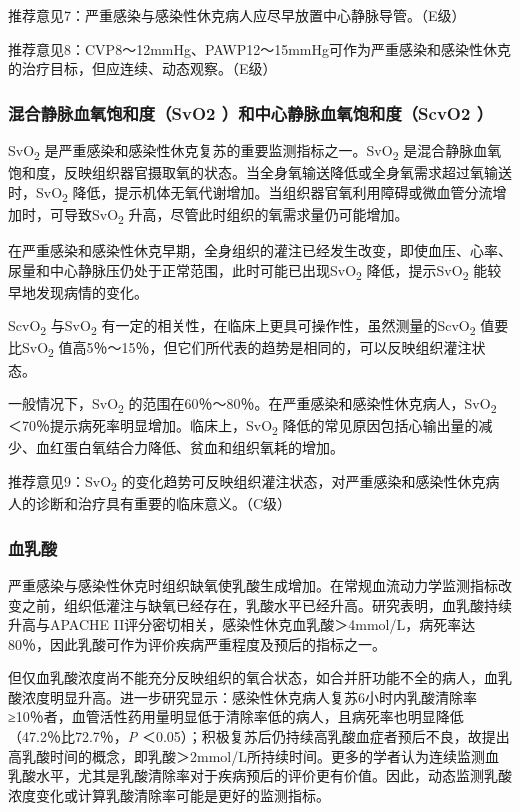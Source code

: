 推荐意见7：严重感染与感染性休克病人应尽早放置中心静脉导管。（E级）

推荐意见8：CVP8～12mmHg、PAWP12～15mmHg可作为严重感染和感染性休克的治疗目标，但应连续、动态观察。（E级）

\subsubsection{混合静脉血氧饱和度（SvO2 ）和中心静脉血氧饱和度（ScvO2 ）}

SvO\textsubscript{2}
是严重感染和感染性休克复苏的重要监测指标之一。SvO\textsubscript{2}
是混合静脉血氧饱和度，反映组织器官摄取氧的状态。当全身氧输送降低或全身氧需求超过氧输送时，SvO\textsubscript{2}
降低，提示机体无氧代谢增加。当组织器官氧利用障碍或微血管分流增加时，可导致SvO\textsubscript{2}
升高，尽管此时组织的氧需求量仍可能增加。

在严重感染和感染性休克早期，全身组织的灌注已经发生改变，即使血压、心率、尿量和中心静脉压仍处于正常范围，此时可能已出现SvO\textsubscript{2}
降低，提示SvO\textsubscript{2} 能较早地发现病情的变化。

ScvO\textsubscript{2} 与SvO\textsubscript{2}
有一定的相关性，在临床上更具可操作性，虽然测量的ScvO\textsubscript{2}
值要比SvO\textsubscript{2}
值高5％～15％，但它们所代表的趋势是相同的，可以反映组织灌注状态。

一般情况下，SvO\textsubscript{2}
的范围在60％～80％。在严重感染和感染性休克病人，SvO\textsubscript{2}
＜70％提示病死率明显增加。临床上，SvO\textsubscript{2}
降低的常见原因包括心输出量的减少、血红蛋白氧结合力降低、贫血和组织氧耗的增加。

推荐意见9：SvO\textsubscript{2}
的变化趋势可反映组织灌注状态，对严重感染和感染性休克病人的诊断和治疗具有重要的临床意义。（C级）

\subsubsection{血乳酸}

严重感染与感染性休克时组织缺氧使乳酸生成增加。在常规血流动力学监测指标改变之前，组织低灌注与缺氧已经存在，乳酸水平已经升高。研究表明，血乳酸持续升高与APACHE
II评分密切相关，感染性休克血乳酸＞4mmol/L，病死率达80％，因此乳酸可作为评价疾病严重程度及预后的指标之一。

但仅血乳酸浓度尚不能充分反映组织的氧合状态，如合并肝功能不全的病人，血乳酸浓度明显升高。进一步研究显示：感染性休克病人复苏6小时内乳酸清除率≥10％者，血管活性药用量明显低于清除率低的病人，且病死率也明显降低（47.2％比72.7％，\emph{P}
＜0.05）；积极复苏后仍持续高乳酸血症者预后不良，故提出高乳酸时间的概念，即乳酸＞2mmol/L所持续时间。更多的学者认为连续监测血乳酸水平，尤其是乳酸清除率对于疾病预后的评价更有价值。因此，动态监测乳酸浓度变化或计算乳酸清除率可能是更好的监测指标。

